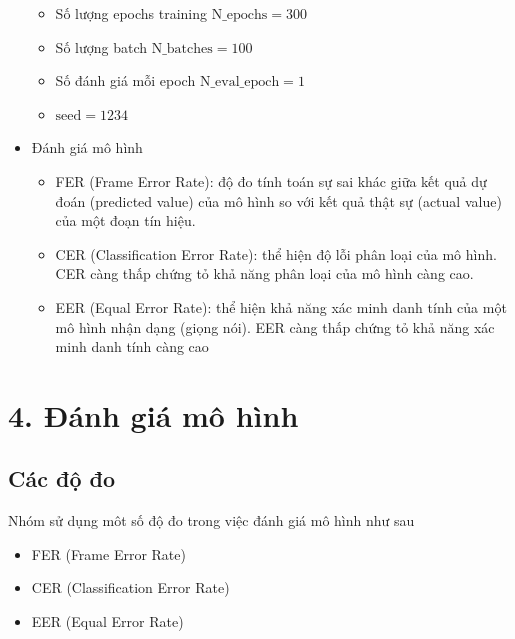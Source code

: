 \documentclass{article}
\begin{document}
\begin{itemize}
\begin{itemize}
			\item Số lượng epochs training $\text{N\_epochs}=300$
			\item Số lượng batch $\text{N\_batches}=100$
			\item Số đánh giá mỗi epoch $\text{N\_eval\_epoch}=1$
			\item $\text{seed}=1234$
		\end{itemize}
		\item Đánh giá mô hình
		\begin{itemize}
			\item FER (Frame Error Rate): độ đo tính toán sự sai khác giữa kết quả dự đoán (predicted value) của mô hình so với kết quả thật sự (actual value) của một đoạn tín hiệu.
			\item CER (Classification Error Rate): thể hiện độ lỗi phân loại của mô hình. CER càng thấp chứng tỏ khả năng phân loại của mô hình càng cao.
			\item EER (Equal Error Rate): thể hiện khả năng xác minh danh tính của một mô hình nhận dạng (giọng nói). EER càng thấp chứng tỏ khả năng xác minh danh tính càng cao
		\end{itemize}
	\end{itemize}	
	\section{4. Đánh giá mô hình}
	\subsection{Các độ đo}
	Nhóm sử dụng môt số độ đo trong việc đánh giá mô hình như sau
	\begin{itemize}
		\item FER (Frame Error Rate)
		\item CER (Classification Error Rate)
		\item EER (Equal Error Rate)
	\end{itemize}
\end{document}
